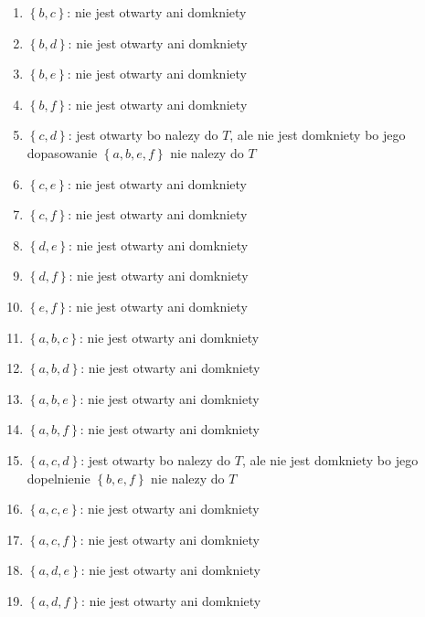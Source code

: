 \documentclass{article}
\begin{document}
\begin{enumerate}
\begin{enumerate}[label=\arabic*.]
            \item $\left\{ b,c \right\}$: nie jest otwarty ani domkniety
            \item $\left\{ b,d \right\}$: nie jest otwarty ani domkniety
            \item $\left\{ b,e \right\}$: nie jest otwarty ani domkniety
            \item $\left\{ b,f \right\}$: nie jest otwarty ani domkniety

            \item $\left\{ c,d \right\}$: jest otwarty bo nalezy do $T$, ale nie jest domkniety bo jego dopasowanie $\left\{ a,b,e,f \right\}$ nie nalezy do $T$
            \item $\left\{ c,e \right\}$: nie jest otwarty ani domkniety
            \item $\left\{ c,f \right\}$: nie jest otwarty ani domkniety

            \item $\left\{ d,e \right\}$: nie jest otwarty ani domkniety
            \item $\left\{ d,f \right\}$: nie jest otwarty ani domkniety

            \item $\left\{ e,f \right\}$: nie jest otwarty ani domkniety

            \item $\left\{ a,b,c \right\}$: nie jest otwarty ani domkniety
            \item $\left\{ a,b,d \right\}$: nie jest otwarty ani domkniety
            \item $\left\{ a,b,e \right\}$: nie jest otwarty ani domkniety
            \item $\left\{ a,b,f \right\}$: nie jest otwarty ani domkniety

            \item $\left\{ a,c,d \right\}$: jest otwarty bo nalezy do $T$, ale nie jest domkniety bo jego dopelnienie $\left\{ b,e,f \right\}$ nie nalezy do $T$
            \item $\left\{ a,c,e \right\}$: nie jest otwarty ani domkniety
            \item $\left\{ a,c,f \right\}$: nie jest otwarty ani domkniety

            \item $\left\{ a,d,e \right\}$: nie jest otwarty ani domkniety
            \item $\left\{ a,d,f \right\}$: nie jest otwarty ani domkniety


\end{enumerate}
\end{enumerate}
\end{document}
